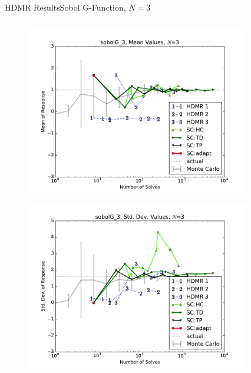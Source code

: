 \documentclass{beamer}
\begin{document}
\begin{frame}{HDMR Results}{Sobol G-Function, $N=3$}\vspace{-20pt}
 \begin{columns}
   \begin{column}{0.5\textwidth}
        \begin{figure}[h!]
          \centering
          \includegraphics[width=0.8\linewidth]{anlmodels/sobolG_3_mean_vals}
        \end{figure}
        \vspace{-20pt}
        \begin{figure}[h!]
          \centering
          \includegraphics[width=0.8\linewidth]{anlmodels/sobolG_3_var_vals}
        \end{figure}
   \end{column}
   \begin{column}{0.5\textwidth}
        \begin{figure}[h!]
          \centering

\end{figure}
\end{column}
\end{columns}
\end{frame}
\end{document}
